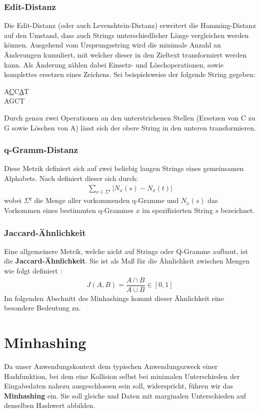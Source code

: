 \subsubsection{Edit-Distanz}
Die Edit-Distanz (oder auch 	Levenshtein-Distanz) erweitert die Hamming-Distanz auf den Umstand, dass auch Strings unterschiedlicher Länge vergleichen werden können. Ausgehend vom Ursprungsstring wird die minimale Anzahl an Änderungen kumuliert, mit welcher dieser in den Zieltext transformiert werden kann. Als Änderung zählen dabei Einsetz- und Löschoperationen, sowie komplettes ersetzen eines Zeichens. Sei beispielsweise der folgende String gegeben:
\begin{center}
	A\underline{C}C\underline{A}T \\
	AGCT
\end{center}
Durch genau zwei Operationen an den unterstrichenen Stellen (Ersetzen von C zu G sowie Löschen von A) lässt sich der obere String in den unteren transformieren.
\subsubsection{q-Gramm-Distanz}
Diese Metrik definiert sich auf zwei beliebig langen Strings eines gemeinsamen Alphabets. Nach \citet{Rahmann2013} definiert dieser sich durch:
\begin{align}
	\sum_{x \in \Sigma^q} \vert N_x(s) - N_x(t) \vert
\end{align}
wobei $\Sigma^q$ die Menge aller vorkommenden q-Gramme und $N_x(s)$ das Vorkommen eines bestimmten q-Grammes $x$ im spezifizierten String $s$ bezeichnet. 
\subsubsection{Jaccard-Ähnlichkeit}
Eine allgemeinere Metrik, welche nicht auf Strings oder Q-Gramme aufbaut, ist die \textbf{Jaccard-Ähnlichkeit}. Sie ist als Maß für die Ähnlichkeit zwischen Mengen wie folgt definiert \citep{Leskovec2014}:
\begin{align}
	\label{eq:jaccard}
	J(A,B) = \dfrac{A \cap B}{A \cup B} \in [0,1]
\end{align}
Im folgenden Abschnitt des Minhashings kommt dieser Ähnlichkeit eine besondere Bedeutung zu.
\section{Minhashing}
\label{sec:hash:min}
Da unser Anwendungskontext dem typischen Anwendungszweck einer Hashfunktion, bei dem eine Kollision selbst bei minimalen Unterschieden der Eingabedaten nahezu ausgeschlossen sein soll, widerspricht, führen wir das \textbf{Minhashing} ein. Sie soll gleiche und Daten mit marginalen Unterschieden auf denselben Hashwert abbilden. 

